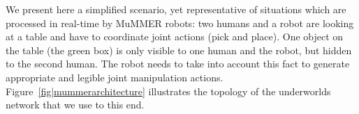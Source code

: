 \documentclass[letterpaper, 10pt, conference]{ieeeconf}
\newcommand{\uwds}{{\sc underworlds}\xspace}
\begin{document}
We present here a simplified scenario, yet representative of situations which
are processed in real-time by MuMMER robots: two humans and a robot are looking
at a table and have to coordinate joint actions (pick and place).  One object on
the table (the green box) is only visible to one human and the robot, but hidden
to the second human. The robot needs to take into account this fact to generate
appropriate and legible joint manipulation actions.
Figure~\ref{fig|mummerarchitecture} illustrates the topology of the \uwds
network that we use to this end. 


\end{document}
